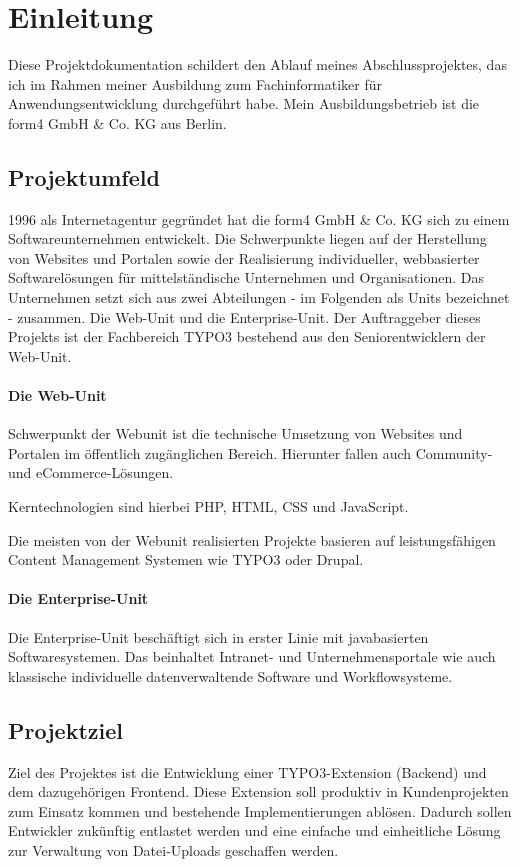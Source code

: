 \section{Einleitung}
\label{sec:Einleitung}
Diese Projektdokumentation schildert den Ablauf meines Abschlussprojektes, das ich im Rahmen meiner Ausbildung zum Fachinformatiker für Anwendungsentwicklung durchgeführt habe. Mein Ausbildungsbetrieb ist die form4 GmbH \& Co. KG aus Berlin.

\subsection{Projektumfeld} 
\label{sec:Projektumfeld}
1996 als Internetagentur gegründet hat die form4 GmbH \& Co. KG sich zu einem Softwareunternehmen entwickelt. Die Schwerpunkte liegen auf der Herstellung von Websites und Portalen sowie der Realisierung individueller, webbasierter Softwarelösungen für mittelständische Unternehmen und Organisationen. Das Unternehmen setzt sich aus zwei Abteilungen - im Folgenden als Units bezeichnet - zusammen. Die Web-Unit und die Enterprise-Unit. Der Auftraggeber dieses Projekts ist der Fachbereich TYPO3 bestehend aus den Seniorentwicklern der Web-Unit.

\paragraph{Die Web-Unit}
Schwerpunkt der Webunit ist die technische Umsetzung von Websites und Portalen im öffentlich zugänglichen Bereich. Hierunter fallen auch Community- und eCommerce-Lösungen.

Kerntechnologien sind hierbei PHP, HTML, CSS und JavaScript.

Die meisten von der Webunit realisierten Projekte basieren auf leistungsfähigen Content Management Systemen wie TYPO3 oder Drupal.

\paragraph{Die Enterprise-Unit}
Die Enterprise-Unit beschäftigt sich in erster Linie mit javabasierten Softwaresystemen. Das beinhaltet Intranet- und Unternehmensportale wie auch klassische individuelle datenverwaltende Software und Workflowsysteme.


\subsection{Projektziel} 
\label{sec:Projektziel}
Ziel des Projektes ist die Entwicklung einer TYPO3-Extension (Backend) und dem dazugehörigen Frontend. Diese Extension soll produktiv in Kundenprojekten zum Einsatz kommen und bestehende Implementierungen ablösen. Dadurch sollen Entwickler zukünftig entlastet werden und eine einfache und einheitliche Lösung zur Verwaltung von Datei-Uploads geschaffen werden. 

